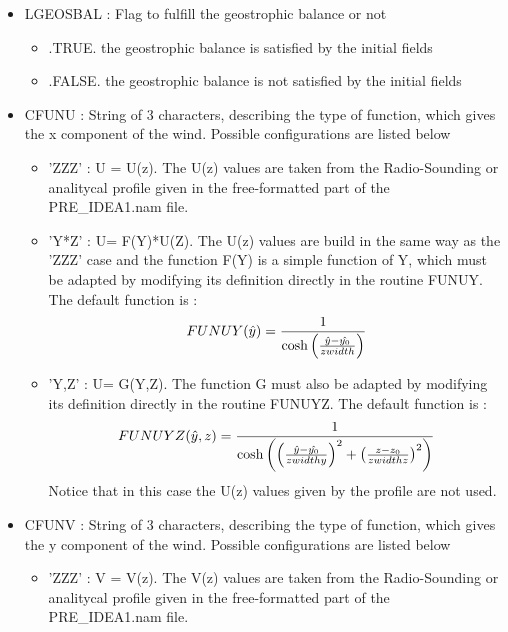 \begin{itemize}

\item LGEOSBAL  : Flag to fulfill the geostrophic balance or not
\begin{itemize}
\item .TRUE. the geostrophic balance is satisfied by the initial fields
\item .FALSE. the geostrophic balance is not satisfied by the initial fields
\end{itemize}


\item CFUNU  : String of 3 characters, describing the type of function, which 
gives the  x component of the wind. Possible configurations are listed below

\begin{itemize}

\item 
'ZZZ'    :  U = U(z). 
The  U(z) values are taken from the
Radio-Sounding or analitycal profile given in the free-formatted part of the 
PRE\_IDEA1.nam file.

\item 
'Y*Z'    : U= F(Y)*U(Z).  
The U(z) values are build in the same way as the
'ZZZ' case and the function F(Y) is a simple function of Y, which must be
adapted by modifying its definition directly in the routine FUNUY. The default
 function is :
$$  FUNUY(\hat{y}) = { 1 \over \cosh \left( 
   { \hat{y} - \hat{y_0} \over zwidth } \right) } $$

\item
 'Y,Z'    : U= G(Y,Z).  
The function  G must also be adapted  by modifying its definition directly in the
 routine FUNUYZ. The default function is :
$$  FUNUYZ(\hat{y},z) = { 1 \over \cosh \left( 
  \left( { \hat{y} - \hat{y_0} \over zwidthy } \right) ^2 +
  \left( { z - z_0 \over zwidthz } \right) ^2 
 \right) } $$
Notice that in this case the U(z) values given by the profile are not used. 
\end{itemize}

\item CFUNV  : String of 3 characters, describing the type of function, which 
gives the  y component of the wind. Possible configurations are listed below

\begin{itemize}

\item 
'ZZZ'    :  V = V(z). 
The  V(z) values are taken from the
Radio-Sounding or analitycal profile given in the free-formatted part of the 
PRE\_IDEA1.nam file.


\end{itemize}
\end{itemize}
